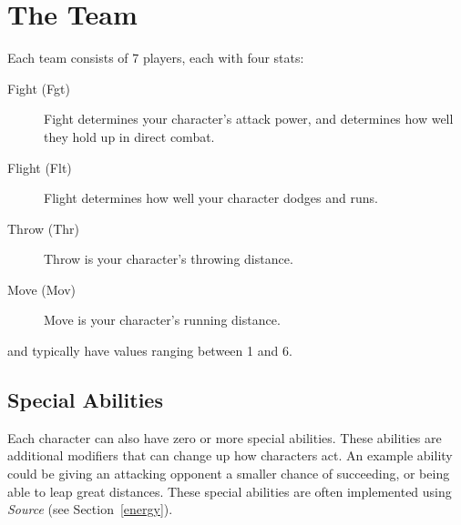 \section{The Team} \label{the-team}
Each team consists of 7 players, each with four stats:

\begin{description}
    \item[Fight (Fgt)] Fight determines your character's attack power, and determines how well they hold up in direct combat.
    \item[Flight (Flt)] Flight determines how well your character dodges and runs.
    \item[Throw (Thr)] Throw is your character's throwing distance.
    \item[Move (Mov)] Move is your character's running distance.
\end{description}

\fight{} and \flight{} typically have values ranging between 1 and 6.

\subsection{Special Abilities}
Each character can also have zero or more special abilities.
These abilities are additional modifiers that can change up how characters act.
An example ability could be giving an attacking opponent a smaller chance of succeeding, or being able to leap great distances.
These special abilities are often implemented using \textit{Source} (see Section~\ref{energy}).
